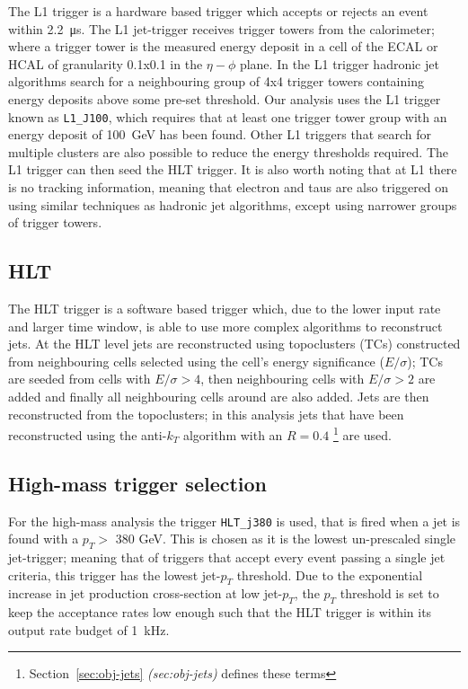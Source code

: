 The L1 trigger is a hardware based trigger which accepts or rejects an event within \SI{2.2}{\micro\second}.
The L1 jet-trigger receives trigger towers from the calorimeter;
where a trigger tower is the measured energy deposit in a cell of the ECAL or HCAL of granularity 0.1x0.1 in the $\eta-\phi$ plane.
In the L1 trigger hadronic jet algorithms search for a neighbouring group of 4x4 trigger towers containing energy deposits above some pre-set threshold.
Our analysis uses the L1 trigger known as \verb|L1_J100|, which requires that at least one trigger tower group with an energy deposit of \SI{100}{\GeV} has been found.
Other L1 triggers that search for multiple clusters are also possible to reduce the energy thresholds required.
The L1 trigger can then seed the HLT trigger.
It is also worth noting that at L1 there is no tracking information, meaning that electron and taus
are also triggered on using similar techniques as hadronic jet algorithms, except using narrower groups of trigger towers.


\subsection{HLT}

The HLT trigger is a software based trigger which, due to the lower input rate and larger time window,
is able to use more complex algorithms to reconstruct jets.
At the HLT level jets are reconstructed using topoclusters (TCs) constructed from neighbouring cells selected using the cell's energy significance ($E/\sigma$);
TCs are seeded from cells with $E/\sigma > 4$, then neighbouring cells with $E/\sigma > 2$ are added
and finally all neighbouring cells around are also added.
Jets are then reconstructed from the topoclusters;
in this analysis jets that have been reconstructed using
the anti-$k_T$ algorithm with an $R = 0.4$ \footnote{Section~\ref{sec:obj-jets} \textit{(sec:obj-jets)} defines these terms} are used. 

\subsection{High-mass trigger selection}

For the high-mass analysis the trigger \verb|HLT_j380| is used, that is fired when a jet is found with a $p_T >$ 380 GeV.
This is chosen as it is the lowest un-prescaled single jet-trigger;
meaning that of triggers that accept every event passing a single jet criteria,
this trigger has the lowest jet-$p_T$ threshold.
Due to the exponential increase in jet production cross-section at low jet-$p_T$,
the $p_T$ threshold is set to keep the acceptance rates low enough such that the HLT trigger is within its output rate budget of 1~kHz.


